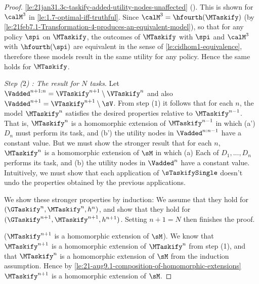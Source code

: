\begin{proof}
\ref{le:21jan31.3c-taskify-added-utility-nodes-unaffected} {(\TaskifySublemmaAddedUtilityNodesName)}.
This is shown for $\calM^3$ in \autoref{le:1.7-optimal-iff-truthful}. Since $\calM^3=\hfourth(\MTaskify)$ (by \autoref{le:21feb7.1-Transformation-4-produces-an-equivalent-model}), so that for any policy $\spi$ on $\MTaskify$, the outcomes of $\MTaskify$ with $\spi$ and $\calM^3$ with ${\hfourth(\spi)}$ are equivalent in the sense of \autoref{le:cidhom1-equivalence}, therefore these models result in the same utility for any policy. Hence the same holds for $\MTaskify$.








\textit{Step ($2$) : The result for $N$ tasks}. 
Let $\Vadded^{n+1:n} = \VTaskify^{n+1} \setminus \VTaskify^n$ and  also $\Vadded^{n+1}=\VTaskify^{n+1} \setminus \sV$.
From step ($1$) it follows that for each $n$, the model $\MTaskify^{n}$ satisfies the desired properties relative to $\MTaskify^{n-1}$. That is, $\MTaskify^{n}$ is a homomorphic extension of $\MTaskify^{n-1}$ in which (a') $D_n$ must perform its task, and (b') the utility nodes in $\Vadded^{n:n-1}$ have a constant value. 
But we must show the stronger result that for each $n$, $\MTaskify^n$ is a homomorphic extension of $\sM$ in which (a) Each of $D_1, ...,D_n$ performs its task, and (b) the utility nodes in $\Vadded^n$ have a constant value. Intuitively, we must show that each application of $\sTaskifySingle$ doesn't undo the properties obtained by the previous applications.

We show these stronger properties by induction: We assume that they hold for $(\GTaskify^n, \MTaskify^n, h^n)$, and show that they hold for $(\GTaskify^{n+1}, \MTaskify^{n+1}, h^{n+1})$. Setting $n+1=N$ then finishes the proof.

($\MTaskify^{n+1}$ is a homomorphic extension of $\sM$). We know that $\MTaskify^{n+1}$ is a homomorphic extension of $\MTaskify^n$ from step (1), and that $\MTaskify^n$ is a homomorphic extension of $\sM$ from the induction assumption. Hence by \autoref{le:21-aug9.1-composition-of-homomorphic-extensions} $\MTaskify^{n+1}$ is a homomorphic extension of $\sM$. 


\end{proof}
